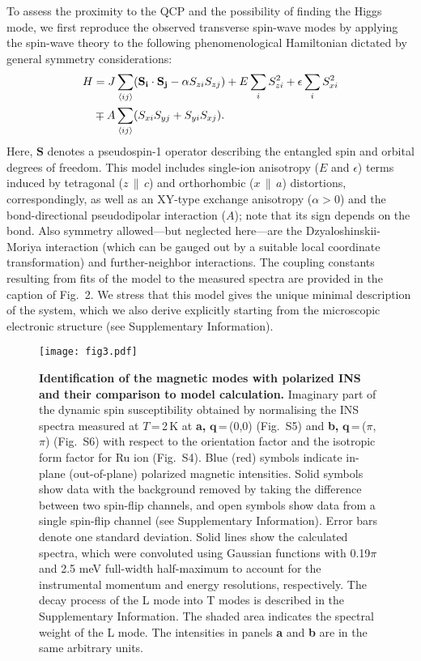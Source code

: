 \documentclass[twocolumn,prb,aps,showpacs]{revtex4-1}
\begin{document}
To assess the proximity to the QCP and the possibility of finding the Higgs mode, we first reproduce the observed transverse spin-wave modes by applying the spin-wave theory\cite{Matsumoto2004,Sommer2001} to the following phenomenological Hamiltonian dictated by general symmetry considerations:
\begin{align}
H &= J\sum_{\langle ij\rangle} (\mathbf{S_{i}\cdot S_{j}}- \alpha S_{zi}S_{zj}) + E \sum_i S^2_{zi} +\epsilon \sum_i S^2_{xi} \notag\\
&\mp A \sum_{\langle ij\rangle} (S_{xi}S_{yj}+S_{yi}S_{xj}).
\end{align}
Here, $\mathbf{S}$ denotes a pseudospin-1 operator describing the entangled spin and orbital degrees of freedom.
This model includes single-ion anisotropy ($E$ and $\epsilon$) terms induced by tetragonal ($z$\,$\parallel$\,$c$) and orthorhombic ($x$\,$\parallel$\,$a$) distortions, correspondingly, as well as an XY-type exchange anisotropy ($\alpha>0$) and the bond-directional pseudodipolar interaction ($A$); note that its sign depends on the bond. Also symmetry allowed---but neglected here---are the Dzyaloshinskii-Moriya interaction (which can be gauged out by a suitable local coordinate transformation) and further-neighbor interactions. The coupling constants resulting from fits of the model to the measured spectra are provided in the caption of Fig.~2. We stress that this model gives the unique minimal description of the system, which we also derive explicitly starting from the microscopic electronic structure (see Supplementary Information). 

\begin{figure}
\centerline{\texttt{[image: fig3.pdf]}}
\caption{{\bf Identification of the magnetic modes with polarized INS and their comparison to model calculation.} Imaginary part of the dynamic spin susceptibility obtained by normalising the INS spectra measured at $T$\,=\,2\,K at {\bf a,} $\mathbf{q}$\,=\,(0,0) (Fig.~S5) and {\bf b,} $\mathbf{q}$\,=\,($\pi$,$\pi$) (Fig.~S6) with respect to the orientation factor and the isotropic form factor for Ru ion (Fig.~S4). Blue (red) symbols indicate in-plane (out-of-plane) polarized magnetic intensities. Solid symbols show data with the background removed by taking the difference between two spin-flip channels, and open symbols show data from a single spin-flip channel (see Supplementary Information). Error bars denote one standard deviation. %
Solid lines show the calculated spectra, which were convoluted using Gaussian functions with 0.19$\pi$ and 2.5 meV full-width half-maximum to account for the instrumental momentum and energy resolutions, respectively. The decay process of the L mode into T modes is described in the Supplementary Information.  The shaded area indicates the spectral weight of the L mode. The intensities in panels {\bf a} and {\bf b} are in the same arbitrary units.}\label{fig:fig1}
\end{figure}
\end{document}
